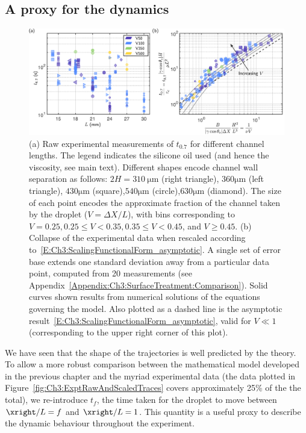 \subsection{A proxy for the dynamics}
\begin{figure}[h]
\centering
\includegraphics[width = \textwidth]{tpt7_both}
\caption{(a) Raw experimental measurements of $t_{0.7}$ for different channel lengths. The legend indicates the silicone oil used (and hence the viscosity, see main text). Different shapes encode channel wall separation as follows: $2H = 310~ \si{\micro \meter}$ (right triangle), $360 \si{\micro \meter}$ (left triangle), $430 \si{\micro \meter}$ (square),$ 540 \si{\micro \meter}$ (circle),$ 630 \si{\micro \meter}$ (diamond). The size of each point encodes the approximate fraction of the channel taken by the droplet ($V = \Delta X /L$), with bins corresponding to $V = 0.25, 0.25 \leq V < 0.35, 0.35 \leq V < 0.45$, and $V \geq 0.45$. (b) Collapse of the experimental data when rescaled according to~\eqref{E:Ch3:ScalingFunctionalForm_asymptotic}. A single set of error base extends one standard deviation away from a particular data point, computed from 20 measurements (see Appendix~\ref{Appendix:Ch3:SurfaceTreatment:Comparison}). Solid curves shown results from numerical solutions of the equations governing the model. Also plotted as a dashed line is the asymptotic result~\eqref{E:Ch3:ScalingFunctionalForm_asymptotic}, valid for $V \ll 1$ (corresponding to the upper right corner of this plot).}\label{fig:Ch3:RawT23}
\end{figure}

We have seen that the shape of the trajectories is well predicted by the theory. To allow a more robust comparison between the mathematical model developed in the previous chapter and the myriad experimental data (the data plotted in Figure~\ref{fig:Ch3:ExptRawAndScaledTraces} covers approximately 25\% of the the total), we re-introduce $t_f$, the time taken for the droplet to move between $\xright/L = f$ and $\xright / L = 1$. This quantity is a useful proxy to describe the dynamic behaviour throughout the experiment.

